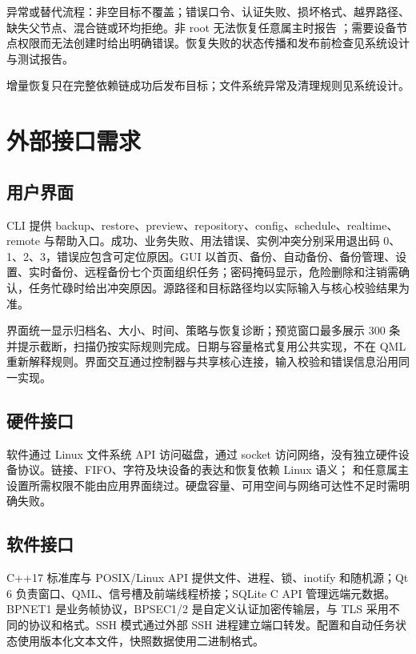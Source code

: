 异常或替代流程：非空目标不覆盖；错误口令、认证失败、损坏格式、越界路径、缺失父节点、混合链或环均拒绝。非 root 无法恢复任意属主时报告 ；需要设备节点权限而无法创建时给出明确错误。恢复失败的状态传播和发布前检查见系统设计与测试报告。

增量恢复只在完整依赖链成功后发布目标；文件系统异常及清理规则见系统设计。


\section{外部接口需求}
\subsection{用户界面}
CLI 提供 backup、restore、preview、repository、config、schedule、realtime、remote 与帮助入口。成功、业务失败、用法错误、实例冲突分别采用退出码 0、1、2、3，错误应包含可定位原因。GUI 以首页、备份、自动备份、备份管理、设置、实时备份、远程备份七个页面组织任务；密码掩码显示，危险删除和注销需确认，任务忙碌时给出冲突原因。源路径和目标路径均以实际输入与核心校验结果为准。

界面统一显示归档名、大小、时间、策略与恢复诊断；预览窗口最多展示 300 条并提示截断，扫描仍按实际规则完成。日期与容量格式复用公共实现，不在 QML 重新解释规则。界面交互通过控制器与共享核心连接，输入校验和错误信息沿用同一实现。

\subsection{硬件接口}
软件通过 Linux 文件系统 API 访问磁盘，通过 socket 访问网络，没有独立硬件设备协议。链接、FIFO、字符及块设备的表达和恢复依赖 Linux 语义； 和任意属主设置所需权限不能由应用界面绕过。硬盘容量、可用空间与网络可达性不足时需明确失败。

\subsection{软件接口}
C++17 标准库与 POSIX/Linux API 提供文件、进程、锁、inotify 和随机源；Qt 6 负责窗口、QML、信号槽及前端线程桥接；SQLite C API 管理远端元数据。BPNET1 是业务帧协议，BPSEC1/2 是自定义认证加密传输层，与 TLS 采用不同的协议和格式。SSH 模式通过外部 SSH 进程建立端口转发。配置和自动任务状态使用版本化文本文件，快照数据使用二进制格式。

